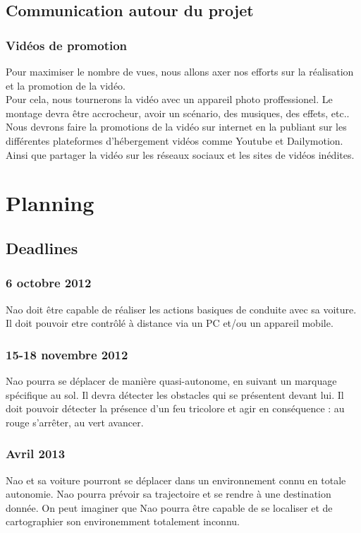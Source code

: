 \documentclass[11pt]{report} %
\begin{document}
	\section{Communication autour du projet}
		\subsection{Vidéos de promotion}
			Pour maximiser le nombre de vues, nous allons axer nos efforts sur la réalisation et la promotion de la vidéo.\\
			Pour cela, nous tournerons la vidéo avec un appareil photo proffessionel. Le montage devra être accrocheur, avoir un scénario, des musiques, des effets, etc..\\
			Nous devrons faire la promotions de la vidéo sur internet en la publiant sur les différentes plateformes d'hébergement vidéos comme Youtube et Dailymotion. Ainsi que partager la vidéo sur les réseaux sociaux et les sites de vidéos inédites.
\chapter{Planning}
	\section{Deadlines}
		\subsection{6 octobre 2012}
			Nao doit être capable de réaliser les actions basiques de conduite avec sa voiture.\\
			Il doit pouvoir etre contrôlé à distance via un PC et/ou un appareil mobile.
		\subsection{15-18 novembre 2012}
			Nao pourra se déplacer de manière quasi-autonome, en suivant un marquage spécifique au sol.
			Il devra détecter les obstacles qui se présentent devant lui.
			Il doit pouvoir détecter la présence d'un feu tricolore et agir en conséquence : au rouge s'arrêter, au vert avancer.
		\subsection{Avril 2013}
			Nao et sa voiture pourront se déplacer dans un environnement connu en totale autonomie.
			Nao pourra prévoir sa trajectoire et se rendre à une destination donnée.
			On peut imaginer que Nao pourra être capable de se localiser et de cartographier son environemment totalement inconnu.
\end{document}

